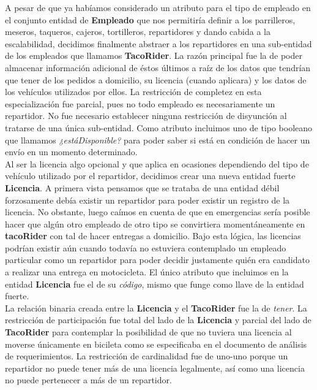 \documentclass[11pt,letterpaper]{article}
\begin{document}
A pesar de que ya habíamos considerado un atributo para el tipo de empleado en el conjunto entidad de \textbf{Empleado} que nos permitiría definir a los parrilleros, meseros, taqueros, cajeros, tortilleros, repartidores y dando cabida a la escalabilidad, decidimos finalmente abstraer a los repartidores en una sub-entidad de los empleados que llamamos \textbf{TacoRider}. La razón principal fue la de poder almacenar información adicional de éstos últimos a raíz de los datos que tendrían que tener de los pedidos a domicilio, su licencia (cuando aplicara) y los datos de los vehículos utilizados por ellos. La restricción de completez en esta especialización fue parcial, pues no todo empleado es necesariamente un repartidor. No fue necesario establecer ninguna restricción de disyunción al tratarse de una única sub-entidad. Como atributo incluimos uno de tipo booleano que llamamos \textit{¿estáDisponible?} para poder saber si está en condición de hacer un envío en un momento determinado. \\

Al ser la licencia algo opcional y que aplica en ocasiones dependiendo del tipo de vehículo utilizado por el repartidor, decidimos crear una nueva entidad fuerte \textbf{Licencia}. A primera vista pensamos que se trataba de una entidad débil forzosamente debía existir un repartidor para poder existir un registro de la licencia. No obstante, luego caímos en cuenta de que en emergencias sería posible hacer que algún otro empleado de otro tipo se convirtiera momentáneamente en \textbf{tacoRider} con tal de hacer entregas a domicilio. Bajo esta lógica, las licencias podrían existir aún cuando todavía no estuviera contemplado un empleado particular como un repartidor para poder decidir justamente quién era candidato a realizar una entrega en motocicleta. El único atributo que incluimos en la entidad \textbf{Licencia} fue el de su \textit{código}, mismo que funge como llave de la entidad fuerte.\\

La relación binaria creada entre la \textbf{Licencia} y el \textbf{TacoRider} fue la de \textit{tener}. La restricción de participación fue total del lado de la \textbf{Licencia} y parcial del lado de \textbf{TacoRider} para contemplar la posibilidad de que no tuviera una licencia al moverse únicamente en bicileta como se especificaba en el documento de análisis de requerimientos. La restricción de cardinalidad fue de uno-uno porque un repartidor no puede tener más de una licencia legalmente, así como una licencia no puede pertenecer a más de un repartidor.\\
\end{document}

